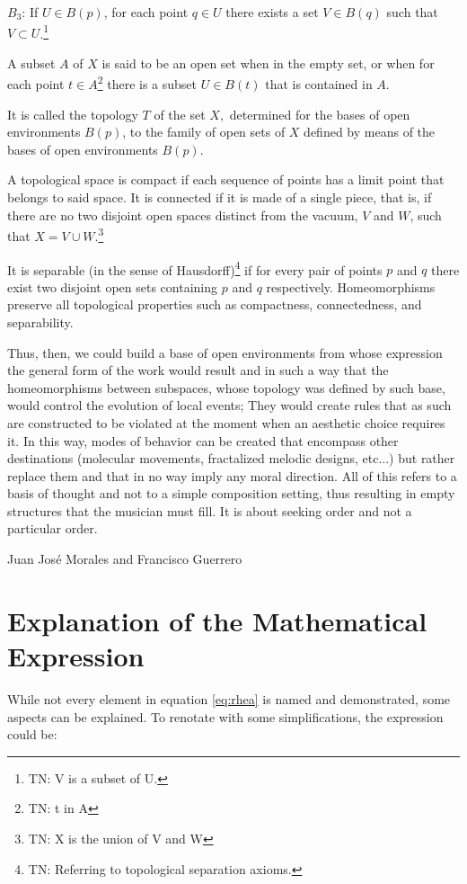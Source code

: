$B_{3}$: If $U \in B(p)$, for each point $q \in U$ there exists a set $V \in B(q)$ such that $V \subset U$.\footnote{TN: V is a subset of U.}

A subset $A$ of $X$ is said to be an open set when in the empty set, or when for each point $t \in A$\footnote{TN: t in A} there is a subset $U \in B(t)$ that is contained in $A$.

It is called the topology $T$ of the set $X,$ determined for the bases of open environments $B(p)$, to the family of open sets of $X$ defined by means of the bases of open environments $B(p)$.

A topological space is compact if each sequence of points has a limit point that belongs to said space. It is connected if it is made of a single piece, that is, if there are no two disjoint open spaces distinct from the vacuum, $V$ and $W$, such that $X=V \cup W$.\footnote{TN: X is the union of V and W}

It is separable (in the sense of Hausdorff)\footnote{TN: Referring to topological separation axioms.} if for every pair of points $p$ and $q$ there exist two disjoint open sets containing $p$ and $q$ respectively. Homeomorphisms preserve all topological properties such as compactness, connectedness, and separability.

Thus, then, we could build a base of open environments from whose expression the general form of the work would result and in such a way that the homeomorphisms between subspaces, whose topology was defined by such base, would control the evolution of local events; They would create rules that as such are constructed to be violated at the moment when an aesthetic choice requires it. In this way, modes of behavior can be created that encompass other destinations (molecular movements, fractalized melodic designs, etc...) but rather replace them and that in no way imply any moral direction. All of this refers to a basis of thought and not to a simple composition setting, thus resulting in empty structures that the musician must fill. It is about seeking order and not a particular order.

\phantom{text} \hfill Juan José Morales and Francisco Guerrero%

\section{Explanation of the Mathematical Expression}

While not every element in equation \ref{eq:rhea} is named and demonstrated, some aspects can be explained. To renotate with some simplifications, the expression could be:

